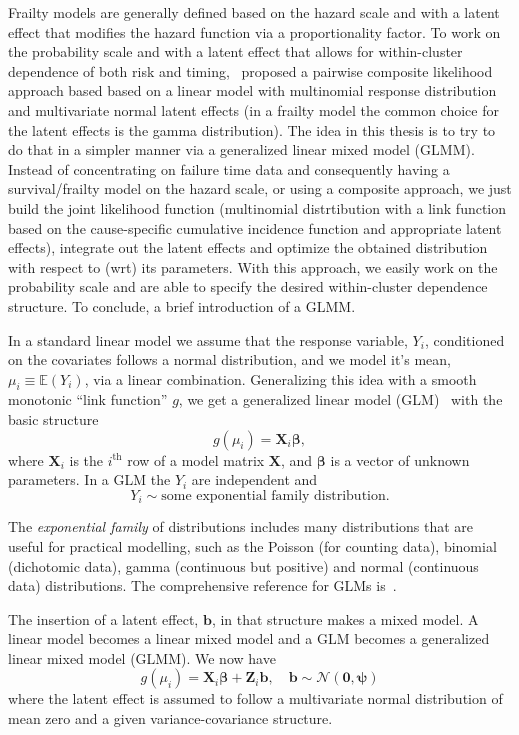 Frailty models are generally defined based on the hazard scale and with
a latent effect that modifies the hazard function via a proportionality
factor. To work on the probability scale and with a latent effect that
allows for within-cluster dependence of both risk and
timing,~ proposed a pairwise composite likelihood
approach based based on a linear model with multinomial response
distribution and multivariate normal latent effects (in a frailty model
the common choice for the latent effects is the gamma distribution). The
idea in this thesis is to try to do that in a simpler manner via a
generalized linear mixed model (GLMM). Instead of concentrating on
failure time data and consequently having a survival/frailty model on
the hazard scale, or using a composite approach, we just build the joint
likelihood function (multinomial distrtibution with a link function
based on the cause-specific cumulative incidence function and
appropriate latent effects), integrate out the latent effects and
optimize the obtained distribution with respect to (wrt) its parameters.
With this approach, we easily work on the probability scale and are able
to specify the desired within-cluster dependence structure. To conclude,
a brief introduction of a GLMM.

In a standard linear model we assume that the response variable,
\(Y_{i}\), conditioned on the covariates follows a normal distribution,
and we model it's mean, \(\mu_{i} \equiv \mathbb{E}(Y_{i})\), via a
linear combination. Generalizing this idea with a smooth monotonic
``link function'' \(g\), we get a generalized linear model
(GLM)~\cite{GLM72} with the basic structure
\[
 g(\mu_{i}) = \mathbf{X}_{i} \bm{\beta},
\]
where \(\mathbf{X}_{i}\) is the \(i^\text{th}\) row of a
model matrix \(\mathbf{X}\), and \(\bm{\beta}\) is a vector of unknown
parameters. In a GLM the \(Y_{i}\) are independent and
\[
  Y_{i} \sim \text{some exponential family distribution}.
\]

The \textit{exponential family} of distributions includes many
distributions that are useful for practical modelling, such as the
Poisson (for counting data), binomial (dichotomic data), gamma
(continuous but positive) and normal (continuous data) distributions.
The comprehensive reference for GLMs is~.

The insertion of a latent effect, \(\mathbf{b}\), in that structure
makes a mixed model. A linear model becomes a linear mixed model and a
GLM becomes a generalized linear mixed model (GLMM). We now have
\[
  g(\mu_{i}) = \mathbf{X}_{i} \bm{\beta} + \mathbf{Z}_{i}\mathbf{b},
  \quad \mathbf{b} \sim \mathcal{N}(\mathbf{0}, \bm{\psi})
\]
where the latent effect is assumed to follow a multivariate normal
distribution of mean zero and a given variance-covariance structure.

